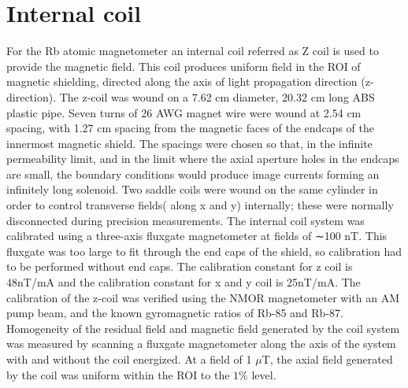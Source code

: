 \section{Internal coil\label{sec:Internal coil}}
 For the Rb atomic magnetometer an internal coil referred as Z coil is used to provide the magnetic field. This coil produces uniform field in the ROI  of magnetic shielding, directed along the axis of light propagation direction (z-direction). The z-coil was wound on a 7.62 cm diameter, 20.32 cm long ABS plastic pipe. Seven turns of 26 AWG magnet wire were wound at 2.54 cm spacing, with 1.27 cm spacing from the magnetic faces of the endcaps of the innermost magnetic shield. The spacings were chosen so that, in the infinite permeability limit, and in the limit where the axial aperture holes in the endcaps are small, the boundary conditions would produce image currents forming an infinitely long solenoid. Two saddle coils were wound on the same cylinder in order to control transverse fields( along x and y) internally; these were normally disconnected during precision measurements. The internal coil system was calibrated using a three-axis fluxgate magnetometer at fields of ∼100 nT. This fluxgate was too large to fit through the end caps of the shield, so calibration
had to be performed without end caps. The calibration constant for z coil is 48nT/mA and the calibration constant for x and y coil is 25nT/mA. The calibration of the z-coil was verified using the NMOR magnetometer with an AM pump beam, and the known gyromagnetic ratios of Rb-85 and Rb-87. Homogeneity of the residual field and magnetic field generated by the coil system was measured by scanning a fluxgate magnetometer along the axis of the system with and without the coil energized. At a field of 1 $\mu$T, the axial field generated by the coil was uniform within the ROI to the $1\%$  level.

